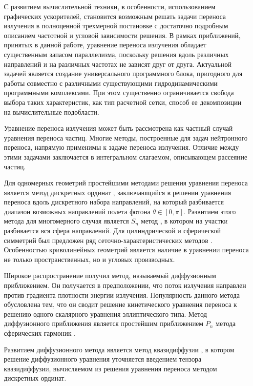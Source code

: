 С развитием вычислительной техники, в особенности, использованием графических ускорителей, становится возможным решать задачи переноса излучения в полноценной трехмерной постановке с достаточно подробным описанием частотной и угловой зависимости решения. В рамках приближений, принятых в данной работе, уравнение переноса излучения обладает существенным запасом параллелизма, поскольку решения вдоль различных направлений и на различных частотах не зависят друг от друга. Актуальной задачей является создание универсального программного блока, пригодного для работы совместно с различными существующими гидродинамическими программными комплексами. При этом существенно ограничивается свобода выбора таких характеристик, как тип расчетной сетки, способ ее декомпозиции на вычислительные подобласти.

\ifdisser
{\develop} Уравнение переноса излучения может быть рассмотрена как частный случай уравнения переноса частиц. Многие методы, построенные для задач нейтронного переноса, напрямую применимы к задаче переноса излучения. Отличие между этими задачами заключается в интегральном слагаемом, описывающем рассеяние частиц.

Для одномерных геометрий простейшими методами решения уравнения переноса является метод дискретных ординат \cite{Wick1943,Chandrasekar1950}, заключающийся в решении уравнения переноса вдоль дискретного набора направлений, на который разбивается диапазон возможных направлений полета фотона $\theta \in [0, \pi]$. Развитием этого метода для многомерного случая является $S_n$ метод \cite{Carlson1953,Lathrop1965}, в котором на участки разбивается вся сфера направлений.
Для цилиндрической и сферической симметрий был предложен ряд сеточно-характеристических методов \cite{Vladimirov1958,Goldin1960}. Особенностью криволинейных геометрий является наличие в уравнении переноса не только пространственных, но и угловых производных.

Широкое распространение получил метод, называемый диффузионным приближением. Он получается в предположении, что поток излучения направлен против градиента плотности энергии излучения. Популярность данного метода обусловлена тем, что он сводит решение кинетического уравнения переноса к решению одного скалярного уравнения эллиптического типа. Метод диффузионного приближения является простейшим приближением $P_n$ метода сферических гармоник \cite{Marshak1947,vladimirov1961,Devison1960}.

Развитием диффузионного метода является метод квазидиффузии \cite{Goldin1964}, в котором решение диффузионного уравнения уточняется введением тензора квазидиффузии, вычисляемом из решения уравнения переноса методом дискретных ординат.


